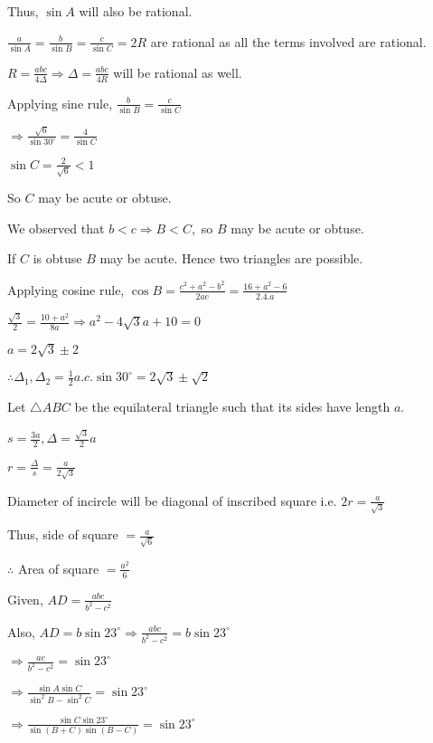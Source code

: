   Thus, $\sin A$ will also be rational.

  $\frac{a}{\sin A} = \frac{b}{\sin B} = \frac{c}{\sin C} = 2R$ are rational as all the terms involved are rational.

  $R = \frac{abc}{4\Delta} \Rightarrow \Delta = \frac{abc}{4R}$ will be rational as well.

\item Applying sine rule, $\frac{b}{\sin B} = \frac{c}{\sin C}$

  $\Rightarrow \frac{\sqrt{6}}{\sin 30^\circ} = \frac{4}{\sin C}$

  $\sin C = \frac{2}{\sqrt{6}} < 1$

  So $C$ may be acute or obtuse.

  We observed that $b < c \Rightarrow B < C,$ so $B$ may be acute or obtuse.

  If $C$ is obtuse $B$ may be acute. Hence two triangles are possible.

  Applying cosine rule, $\cos B = \frac{c^2 + a^2 - b^2}{2ac} = \frac{16 + a^2 - 6}{2.4.a}$

  $\frac{\sqrt{3}}{2} = \frac{10 + a^2}{8a} \Rightarrow a^2 - 4\sqrt{3}a + 10 = 0$

  $a = 2\sqrt{3}\pm 2$

  $\therefore \Delta_1, \Delta_2 = \frac{1}{2}a.c.\sin30^\circ = 2\sqrt{3}\pm\sqrt{2}$

\item Let $\triangle ABC$ be the equilateral triangle such that its sides have length $a.$

  $s = \frac{3a}{2}, \Delta = \frac{\sqrt{3}}{2}a$

  $r = \frac{\Delta}{s} = \frac{a}{2\sqrt{3}}$

  Diameter of incircle will be diagonal of inscribed square i.e. $2r = \frac{a}{\sqrt{3}}$

  Thus, side of square $= \frac{a}{\sqrt{6}}$

  $\therefore$ Area of square $= \frac{a^2}{6}$

\item Given, $AD = \frac{abc}{b^2 - c^2}$

  Also, $AD = b\sin 23^\circ \Rightarrow \frac{abc}{b^2 - c^2} = b\sin23^\circ$

  $\Rightarrow \frac{ac}{b^2 - c^2} = \sin23^\circ$

  $\Rightarrow \frac{\sin A\sin C}{\sin^2B - \sin^2C} = \sin23^\circ$

  $\Rightarrow \frac{\sin C\sin 23^\circ}{\sin(B + C)\sin(B - C)} = \sin23^\circ$

